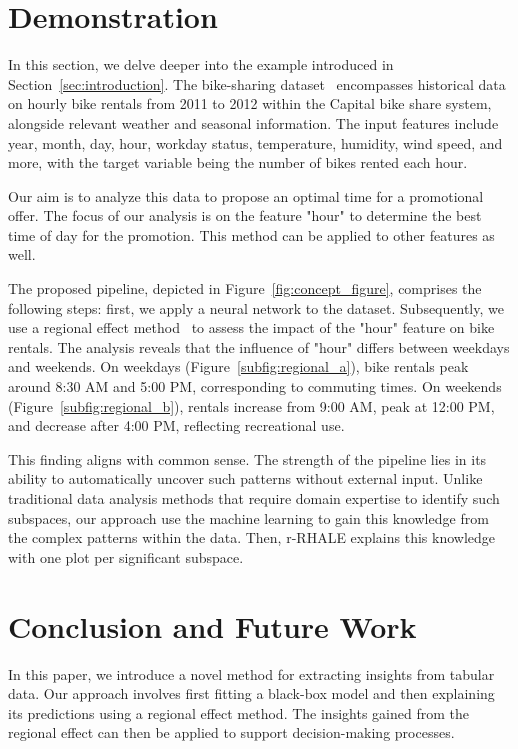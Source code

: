 \documentclass[sigconf, nonacm]{acmart}
\begin{document}
\section{Demonstration}
\label{sec:demonstration}

In this section, we delve deeper into the example introduced in Section~\ref{sec:introduction}. The bike-sharing dataset~\cite{fanaee2014event} encompasses historical data on hourly bike rentals from 2011 to 2012 within the Capital bike share system, alongside relevant weather and seasonal information. The input features include year, month, day, hour, workday status, temperature, humidity, wind speed, and more, with the target variable being the number of bikes rented each hour.

Our aim is to analyze this data to propose an optimal time for a promotional offer. The focus of our analysis is on the feature "hour" to determine the best time of day for the promotion. This method can be applied to other features as well.

The proposed pipeline, depicted in Figure~\ref{fig:concept_figure}, comprises the following steps: first, we apply a neural network to the dataset. Subsequently, we use a regional effect method~\cite{herbinger2023decomposing, herbinger_repid_2022} to assess the impact of the "hour" feature on bike rentals. The analysis reveals that the influence of "hour" differs between weekdays and weekends. On weekdays (Figure~\ref{subfig:regional_a}), bike rentals peak around 8:30 AM and 5:00 PM, corresponding to commuting times. On weekends (Figure~\ref{subfig:regional_b}), rentals increase from 9:00 AM, peak at 12:00 PM, and decrease after 4:00 PM, reflecting recreational use.

This finding aligns with common sense. The strength of the pipeline lies in its ability to automatically uncover such patterns without external input. Unlike traditional data analysis methods that require domain expertise to identify such subspaces, our approach use the machine learning to gain this knowledge from the complex patterns within the data. Then, r-RHALE explains this knowledge with one plot per significant subspace.

\section{Conclusion and Future Work}

In this paper, we introduce a novel method for extracting insights from tabular data. Our approach involves first fitting a black-box model and then explaining its predictions using a regional effect method. The insights gained from the regional effect can then be applied to support decision-making processes.
\end{document}
